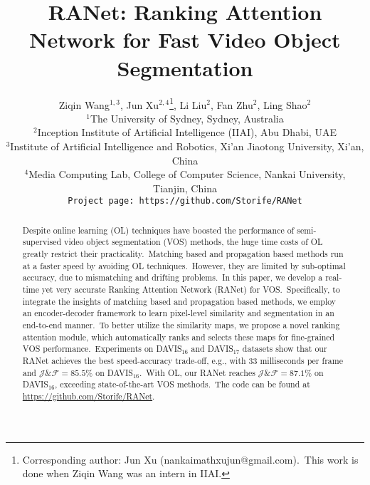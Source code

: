 \documentclass[10pt,twocolumn,letterpaper]{article}
\begin{document}
\title{RANet: Ranking Attention Network for Fast Video Object Segmentation}

\author{Ziqin Wang$^{1,3}$, Jun Xu$^{2,4}$\thanks{Corresponding author: Jun Xu (nankaimathxujun@gmail.com).\ This work is done when Ziqin Wang was an intern in IIAI.}, Li Liu$^{2}$, Fan Zhu$^{2}$, Ling Shao$^{2}$\\
$^1$The University of Sydney, Sydney, Australia\\
$^2$Inception Institute of Artificial Intelligence (IIAI), Abu Dhabi, UAE\\
$^3$Institute of Artificial Intelligence and Robotics, Xi'an Jiaotong University, Xi'an, China\\
$^4$Media Computing Lab, College of Computer Science, Nankai University, Tianjin, China\\
{\tt\small Project page:\ https://github.com/Storife/RANet}
}








\maketitle
\thispagestyle{empty}
\pagestyle{empty}


\begin{abstract}
Despite online learning (OL) techniques have boosted the performance of semi-supervised video object segmentation (VOS) methods, the huge time costs of OL greatly restrict their practicality.\ Matching based and propagation based methods run at a faster speed by avoiding OL techniques.\ However, they are limited by sub-optimal accuracy, due to mismatching and drifting problems.\ In this paper, we develop a real-time yet very accurate Ranking Attention Network (RANet) for VOS.\ Specifically, to integrate the insights of matching based and propagation based methods, we employ an encoder-decoder framework to learn pixel-level similarity and segmentation in an end-to-end manner.\ To better utilize the similarity maps, we propose a novel ranking attention module, which automatically ranks and selects these maps for fine-grained VOS performance.\ Experiments on DAVIS$_{16}$ and DAVIS$_{17}$ datasets show that our RANet achieves the best speed-accuracy trade-off, e.g., with $33$ milliseconds per frame and $\mathcal{J}\&\mathcal{F}$$=$$85.5\%$ on DAVIS$_{16}$.\ With OL, our RANet reaches $\mathcal{J}\&\mathcal{F}$$=$$87.1\%$ on DAVIS$_{16}$, exceeding state-of-the-art VOS methods.\ The code can be found at \url{https://github.com/Storife/RANet}.
\end{abstract}
\end{document}

